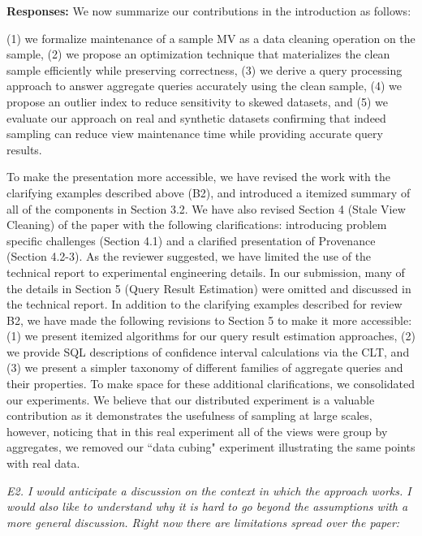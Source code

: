 {\bf Responses:} We now summarize our contributions in the introduction as follows:
\begin{displayquote}
(1) we formalize maintenance of a sample MV as a data cleaning operation on the sample, (2) we propose an optimization technique that materializes the clean sample efficiently while preserving correctness, (3) we derive a query processing approach to answer aggregate queries accurately using the clean sample, (4) we propose an outlier index to reduce sensitivity to skewed datasets, and (5) we evaluate our approach on real and synthetic datasets confirming that indeed sampling can reduce view maintenance time while providing accurate query results. 
\end{displayquote}
To make the presentation more accessible, we have revised the work with the clarifying examples described above (B2), and introduced a itemized summary of all of the components in Section 3.2. We have also revised Section 4 (Stale View Cleaning) of the paper with the following clarifications: introducing problem specific challenges (Section 4.1) and a clarified presentation of Provenance (Section 4.2-3). As the reviewer suggested, we have limited the use of the technical report to experimental engineering details. In our submission, many of the details in Section 5 (Query Result Estimation) were omitted and discussed in the technical report. In addition to the clarifying examples described for review B2, we have made the following revisions to Section 5 to make it more accessible: (1) we present itemized algorithms for our query result estimation approaches, (2) we provide SQL descriptions of confidence interval calculations via the CLT, and (3) we present a simpler taxonomy of different families of aggregate queries and their properties. 
To make space for these additional clarifications, we consolidated our experiments. We believe that our distributed experiment is a valuable contribution as it demonstrates the usefulness of sampling at large scales, however, noticing that in this real experiment all of the views were group by aggregates, we removed our ``data cubing" experiment illustrating the same points with real data.

\vspace{1em}
\emph{E2. I would anticipate a discussion on the context in which the approach works. I would also like to understand why it is hard to go beyond the assumptions with a more general discussion. Right now there are limitations spread over the paper: }

\vspace{.25em}

